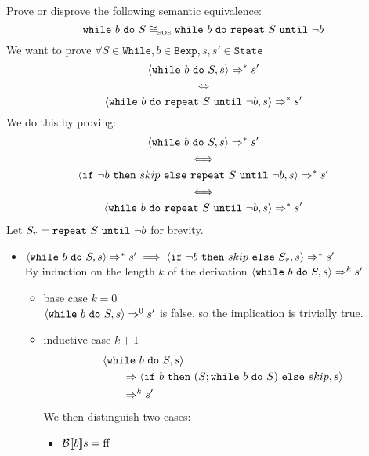 \begin{exercise}{
    Prove or disprove the following semantic equivalence:
    \[ \texttt{while}\ b\ \texttt{do}\ S \cong_{\text{\tiny SOS}} \texttt{while}\ b\ \texttt{do}\ \texttt{repeat}\ S\ \texttt{until}\ \neg b  \]\vspace*{-0.6cm}
}
    We want to prove $\forall S \in \texttt{While}, b \in \texttt{Bexp}, s, s' \in \texttt{State}$
    \[ \left<\texttt{while}\ b\ \texttt{do}\ S, s\right> \Rightarrow^* s' \]\vspace*{-0.9cm}
    \[ \iff \]\vspace*{-0.7cm}
    \[ \left<\texttt{while}\ b\ \texttt{do}\ \texttt{repeat}\ S\ \texttt{until}\ \neg b, s\right> \Rightarrow^* s' \]
    We do this by proving:
    \begin{gather*}
        \left<\texttt{while}\ b\ \texttt{do}\ S, s\right> \Rightarrow^* s' \\
        \iff \\
        \left<\texttt{if}\ \neg b\ \texttt{then}\ skip\ \texttt{else}\ \texttt{repeat}\ S\ \texttt{until}\ \neg b, s\right> \Rightarrow^* s' \\
        \iff \\
        \left<\texttt{while}\ b\ \texttt{do}\ \texttt{repeat}\ S\ \texttt{until}\ \neg b, s\right> \Rightarrow^* s'
    \end{gather*}
    Let $S_r = \texttt{repeat}\ S\ \texttt{until}\ \neg b$ for brevity.
    \begin{itemize}
        \item $\left<\texttt{while}\ b\ \texttt{do}\ S, s\right> \Rightarrow^* s' \implies \left<\texttt{if}\ \neg b\ \texttt{then}\ skip\ \texttt{else}\ S_r, s\right> \Rightarrow^* s'$ \\
            By induction on the length $k$ of the derivation $\left<\texttt{while}\ b\ \texttt{do}\ S, s\right> \Rightarrow^k s'$
            \begin{itemize}
                \item base case $k=0$ \\
                $\left<\texttt{while}\ b\ \texttt{do}\ S, s\right> \Rightarrow^0 s'$ is false, so the implication is trivially true.
                \item inductive case $k+1$ \vspace*{-0.3cm}
                \begin{align*}
                    &\left<\texttt{while}\ b\ \texttt{do}\ S, s\right>
                    \\&\qquad\Rightarrow \left<\texttt{if}\ b\ \texttt{then}\ (S; \texttt{while}\ b\ \texttt{do}\ S)\ \texttt{else}\ skip, s\right>
                    \\&\qquad\Rightarrow^k s'
                \end{align*}
                We then distinguish two cases:
                \begin{itemize}
                    \item $\mathcal{B} \llbracket b \rrbracket s = \text{ff}$

\end{itemize}
\end{itemize}
\end{itemize}
\end{exercise}
